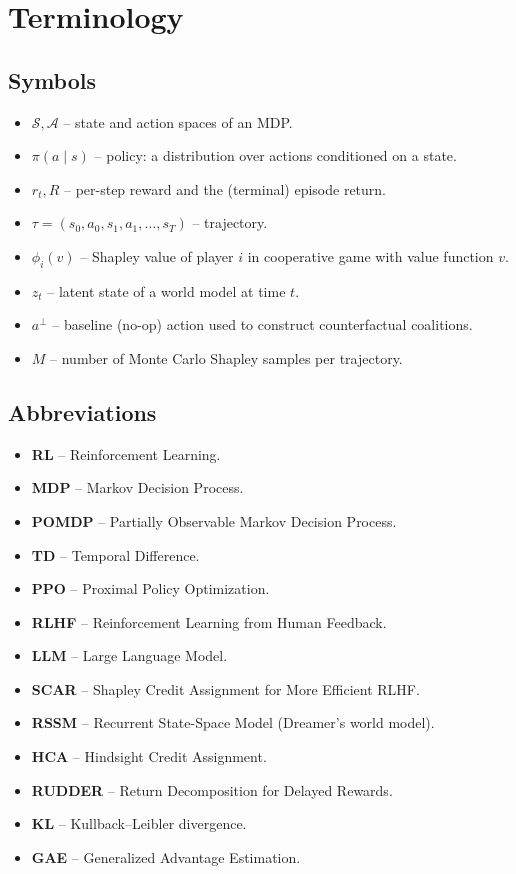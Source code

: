 \chapter*{Terminology}

\section*{Symbols}

\begin{itemize}
    \setlength\itemsep{2px}
    \item $\mathcal{S}, \mathcal{A}$ -- state and action spaces of an MDP.
    \item $\pi(a \mid s)$ -- policy: a distribution over actions conditioned on a state.
    \item $r_t, R$ -- per-step reward and the (terminal) episode return.
    \item $\tau = (s_0, a_0, s_1, a_1, \dots, s_T)$ -- trajectory.
    \item $\phi_i(v)$ -- Shapley value of player $i$ in cooperative game with value function $v$.
    \item $z_t$ -- latent state of a world model at time $t$.
    \item $a^{\bot}$ -- baseline (no-op) action used to construct counterfactual coalitions.
    \item $M$ -- number of Monte Carlo Shapley samples per trajectory.
\end{itemize}

\section*{Abbreviations}

\begin{itemize}
    \setlength\itemsep{2px}
    \item \textbf{RL} -- Reinforcement Learning.
    \item \textbf{MDP} -- Markov Decision Process.
    \item \textbf{POMDP} -- Partially Observable Markov Decision Process.
    \item \textbf{TD} -- Temporal Difference.
    \item \textbf{PPO} -- Proximal Policy Optimization.
    \item \textbf{RLHF} -- Reinforcement Learning from Human Feedback.
    \item \textbf{LLM} -- Large Language Model.
    \item \textbf{SCAR} -- Shapley Credit Assignment for More Efficient RLHF.
    \item \textbf{RSSM} -- Recurrent State-Space Model (Dreamer's world model).
    \item \textbf{HCA} -- Hindsight Credit Assignment.
    \item \textbf{RUDDER} -- Return Decomposition for Delayed Rewards.
    \item \textbf{KL} -- Kullback--Leibler divergence.
    \item \textbf{GAE} -- Generalized Advantage Estimation.
\end{itemize}